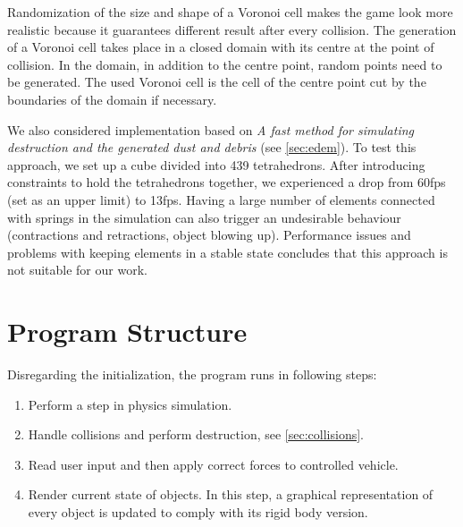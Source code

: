 Randomization of the size and shape of a Voronoi cell makes the game look more realistic because it guarantees different result after every collision. The generation of a Voronoi cell takes place in a closed domain with its centre at the point of collision. In the domain, in addition to the centre point, random points need to be generated. The used Voronoi cell is the cell of the centre point cut by the boundaries of the domain if necessary.

We also considered implementation based on \emph{A fast method for simulating destruction and the generated dust and debris} (see \cref{sec:edem}). To test this approach, we set up a cube divided into 439 tetrahedrons. After introducing constraints to hold the tetrahedrons together, we experienced a drop from 60fps (set as an upper limit) to 13fps. Having a large number of elements connected with springs in the simulation can also trigger an undesirable behaviour (contractions and retractions, object blowing up). Performance issues and problems with keeping elements in a stable state concludes that this approach is not suitable for our work.




\section{Program Structure}
Disregarding the initialization, the program runs in following steps:
\begin{enumerate}
\item Perform a step in physics simulation.
\item Handle collisions and perform destruction, see \cref{sec:collisions}.
\item Read user input and then apply correct forces to controlled vehicle.
\item Render current state of objects. In this step, a graphical representation of every object is updated to comply with its rigid body version.
\end{enumerate}

